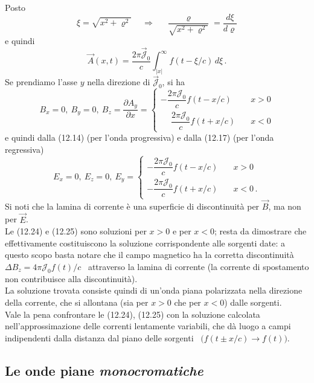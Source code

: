 Posto
\begin{equation}
  \xi=\sqrt{x^2+\varrho^2}\quad\ \Rightarrow
  \quad\ \frac{\varrho}{\sqrt{x^2+\varrho^2}}=\frac{d\xi}{d\varrho}
  \tag{12.22}
\end{equation}
e quindi
\begin{equation}
  \vec A(x,t)
  =\frac{2\pi\vec{\mathcal J}_0}{c}\int_{|x|}^\infty f(t-\xi/c)\,d\xi\,.
  \tag{12.23}
\end{equation}
Se prendiamo l'asse $y$ nella direzione di $\vec{\mathcal J}_0$, si ha
\begin{equation}
  B_x=0,\ B_y=0,\ B_z=\frac{\partial A_y}{\partial x}=\left\{\begin{array}{ll}
    -\dfrac{2\pi\mathcal J_0}{c}f(t-x/c)&\quad x>0\\[10pt]
    \phantom{-}\dfrac{2\pi\mathcal J_0}{c}f(t+x/c)&\quad x<0
  \end{array}\right.
  \tag{12.24}
\end{equation}
e quindi dalla (12.14) (per l'onda progressiva) e dalla (12.17) (per l'onda
regressiva)
\begin{equation}
  E_x=0,\ E_z=0,\ E_y=\left\{\begin{array}{ll}
    -\dfrac{2\pi\mathcal J_0}{c}f(t-x/c)&\quad x>0\\[10pt]
    -\dfrac{2\pi\mathcal J_0}{c}f(t+x/c)&\quad x<0\,.
  \end{array}\right.
  \tag{12.25}
\end{equation}
Si noti che la lamina di corrente \`e una superficie di discontinuit\`a per
$\vec B$, ma non per $\vec E$.\\
Le (12.24) e (12.25) sono soluzioni per $x>0$ e per $x<0$; resta da dimostrare
che effettivamente costituiscono la soluzione corrispondente alle sorgenti date:
a questo scopo basta notare che il campo magnetico ha la corretta
discontinuit\`a \ $\Delta B_z=4\pi\mathcal J_0f(t)/c$ \ attraverso la lamina di
corrente (la corrente di spostamento non contribuisce alla discontinuit\`a).\\
La soluzione trovata consiste quindi di un'onda piana polarizzata nella
direzione della corrente, che si allontana (sia per $x>0$ che per $x<0$) dalle
sorgenti.\\
Vale la pena confrontare le (12.24), (12.25) con la soluzione calcolata
nell'approssimazione delle correnti lentamente variabili, che d\`a luogo a campi
indipendenti dalla distanza dal piano delle sorgenti
\ $\big(f(t\pm x/c)\to f(t)\big)$.

\subsection{Le onde piane \textit{monocromatiche}}


